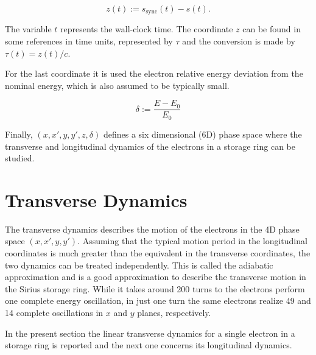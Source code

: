 \begin{equation}
    z(t) := s_{\mathrm{sync}}(t) - s(t).
\end{equation}

The variable $t$ represents the wall-clock time. The coordinate $z$ can be found in some references in time units, represented by $\tau$ and the conversion is made by $\tau(t) = z(t)/c$. 

For the last coordinate it is used the electron relative energy deviation from the nominal energy, which is also assumed to be typically small.

\begin{equation}
    \delta := \frac{E - E_0}{E_0}
\end{equation}

Finally, $(x, x', y, y', z, \delta)$ defines a six dimensional (6D) phase space where the transverse and longitudinal dynamics of the electrons in a storage ring can be studied.


\section{Transverse Dynamics}\label{tranverse}

The transverse dynamics describes the motion of the electrons in the 4D phase space $(x, x', y, y')$. Assuming that the typical motion period in the longitudinal coordinates is much greater than the equivalent in the transverse coordinates, the two dynamics can be treated independently. This is called the adiabatic approximation and is a good approximation to describe the transverse motion in the Sirius storage ring. While it takes around 200 turns to the electrons perform one complete energy oscillation, in just one turn the same electrons realize 49 and 14 complete oscillations in $x$ and $y$ planes, respectively.

In the present section the linear transverse dynamics for a single electron in a storage ring is reported and the next one concerns its longitudinal dynamics.

